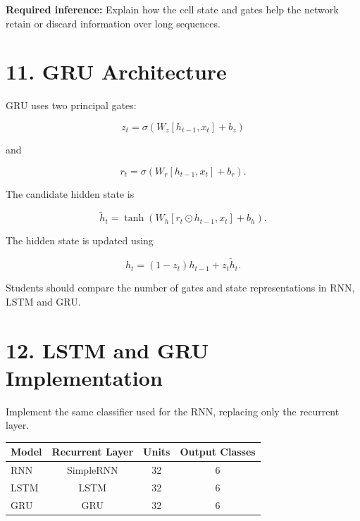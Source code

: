 \documentclass[10pt]{article}
\begin{document}
\textbf{Required inference:} Explain how the cell state and gates help the
network retain or discard information over long sequences.

\section*{11. GRU Architecture}

GRU uses two principal gates:

\[
z_t=\sigma(W_z[h_{t-1},x_t]+b_z)
\]

and

\[
r_t=\sigma(W_r[h_{t-1},x_t]+b_r).
\]

The candidate hidden state is

\[
\tilde{h}_t=
\tanh(W_h[r_t\odot h_{t-1},x_t]+b_h).
\]

The hidden state is updated using

\[
h_t=(1-z_t)h_{t-1}+z_t\tilde{h}_t.
\]

\begin{center}
\end{center}

Students should compare the number of gates and state representations in
RNN, LSTM and GRU.

\section*{12. LSTM and GRU Implementation}

Implement the same classifier used for the RNN, replacing only the recurrent
layer.

\begin{center}
\begin{tabular}{|l|c|c|c|}
\hline
Model & Recurrent Layer & Units & Output Classes\\
\hline
RNN & SimpleRNN & 32 & 6\\
LSTM & LSTM & 32 & 6\\
GRU & GRU & 32 & 6\\
\hline
\end{tabular}
\end{center}
\end{document}
